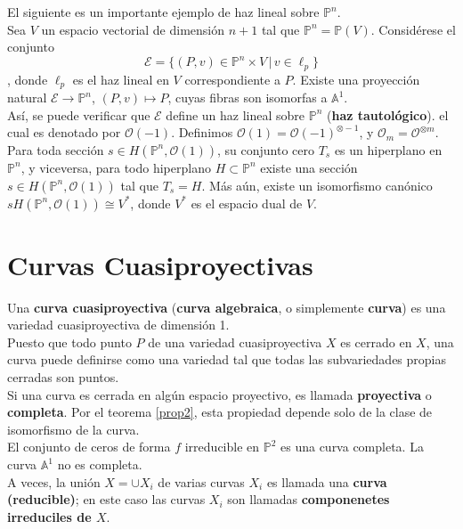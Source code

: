 \documentclass[12pt,a4paper]{report}
\newcommand{\Ou}{\mathscr{O}}
\newcommand{\ep}{\mathbb{P}^{n}}
\begin{document}
El siguiente es un importante ejemplo de haz lineal sobre $\ep$.\\
Sea $V$ un espacio vectorial de dimensión $n+1$ tal que $\ep = \mathbb{P}(V)$. Considérese el conjunto $$ \mathscr{E} = \{ (P,v) \in \ep \times V \, | \, v \in \mathscr{\ell}_{p} \} $$, donde $\ell _{p}$ es el haz lineal en $V$ correspondiente a $P$. Existe una proyección natural $ \mathscr{E} \rightarrow \ep$, $(P,v)\mapsto P$, cuyas fibras son isomorfas a $\mathbb{A}^{1}$. \\
Así, se puede verificar que $\mathscr{E}$ define un haz lineal sobre $\ep$ (\textbf{haz tautológico}). el cual es denotado por $\mathscr{O}(-1)$. Definimos $\mathscr {O}(1)= \mathscr{O}(-1)^{\otimes -1} $, y $\mathscr{O}_{m}= \mathscr {O}^{\otimes m}$. \\
Para toda sección $s \in H (\ep, \Ou (1))$, su conjunto cero $T_{s}$ es un hiperplano en $\ep$, y viceversa, para todo hiperplano $H \subset \ep$ existe una sección $s \in H (\ep, \Ou (1))$ tal que $ T_{s} = H$. Más aún, existe un isomorfismo canónico $sH (\ep, \Ou (1)) \cong V^{*}$, donde $V^{*}$ es el espacio dual de $V$.




\section{Curvas Cuasiproyectivas}
Una \textbf{curva cuasiproyectiva} (\textbf{curva algebraica}, o simplemente \textbf{curva}) es una variedad cuasiproyectiva de dimensión 1. \\
Puesto que todo punto $P$ de una variedad cuasiproyectiva $X$ es cerrado en $X$, una curva puede definirse como una variedad tal que todas las subvariedades propias cerradas son puntos. \\
Si una curva es cerrada en algún espacio proyectivo, es llamada \textbf{proyectiva} o \textbf{completa}. Por el teorema \ref{prop2}, esta propiedad depende solo de la clase de isomorfismo de la curva.\\

El conjunto de ceros de forma $f$ irreducible en $\mathbb{P}^{2}$ es una curva completa. La curva $\mathbb{A}^{1}$ no es completa.\\

A veces, la unión $X= \cup X_{i}$ de varias curvas $X_{i}$ es llamada una \textbf{curva (reducible)}; en este caso las curvas $X_{i}$ son llamadas \textbf{componenetes irreduciles de $X$}. \\
\end{document}
